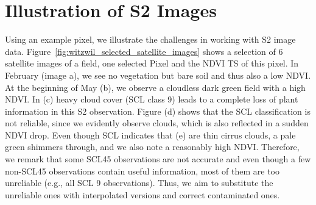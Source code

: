 		
\section{Illustration of S2 Images}{\label{sec:s2_challangges}
	
	Using an example pixel, we illustrate the challenges in working with S2 image data. Figure~\ref{fig:witzwil_selected_satellite_images} shows a selection of 6 satellite images of a field, one selected Pixel and the NDVI {TS} of this pixel. 		
	In February (image a), we see no vegetation but bare soil and thus also a low NDVI. At the beginning of May (b), we observe a cloudless dark green field with a high NDVI. In (c) heavy cloud cover (SCL class 9) leads to a complete loss of plant information in this S2 observation. Figure (d) shows that the SCL classification is not reliable, since we evidently observe clouds, which is also reflected in a sudden NDVI drop. Even though SCL indicates that (e) are thin cirrus clouds, a pale green shimmers through, and we also note a reasonably high NDVI. Therefore, we remark that some SCL45 observations are not accurate and even though a few non-SCL45 observations contain useful information, most of them are too unreliable (e.g., all SCL 9 observations). Thus, we aim to substitute the unreliable ones with interpolated versions and correct contaminated ones.
		
}

